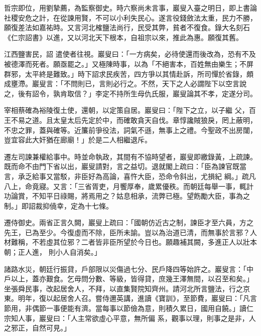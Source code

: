 \begin{pinyinscope}
 哲宗即位，用劉摯薦，為監察御史。時六察尚未言事，巖叟入臺之明日，即上書論社稷安危之計，在從諫用賢，不可以小利失民心。遂言役錢斂法太重，民力不勝，願復差法如嘉祐時。又言河北榷鹽法尚行，民受其弊，貧者不復食。錄大名刻石《仁宗詔書》以進，又以河北天下根本，自祖宗以來，推此為惠。願復其舊。



 江西鹽害民，詔
 遣使者往視。巖叟曰：「一方病矣，必待使還而後改為，恐有不及被德澤而死者。願亟罷之。」又極陳時事，以為「不絕害本，百姓無由樂生；不屏群邪，太平終是難致。」時下詔求民疾苦，四方爭以其情赴訴，所司憚於省錄，頗成壅滯。巖叟言：「不問則已，言則必行之。不然，天下之人必謂陛下以空言說之，後有詔令，孰肯取信？」李定不持所生母仇氏服，巖叟論其不孝，定遂分司。



 宰相蔡確為裕陵復土使，還朝，以定策自居。巖叟曰：「陛下之立，以子繼
 父，百王不易之道。且太皇太后先定於中，而確敢貪天自伐。章惇讒賊狼戾，罔上蔽明，不忠之罪，蓋與確等。近簾前爭役法，詞氣不遜，無事上之禮。今聖政不出房闥，豈宜容此大奸猶在廊廟！」於是二人相繼退斥。



 遷左司諫兼權給事中。時並命執政，其間有不協時望者，巖叟即繳錄黃，上疏諫。既而命不由門下省以出，巖叟請對，言之益切。退就閣上疏曰：「臣為諫官既當言，承乏給事又當駁，非臣好為高論，喜忤大臣，恐命令斜出，尤損紀
 綱。」疏凡八上，命竟寢。又言：「三省胥吏，月饗厚奉，歲累優秩。而朝廷每舉一事，輒計功論賞，不知平日祿賜，將焉用之？姑息相承，流弊已極。望飭勵大臣，事為之制。」即詔裁抑僥幸，定為十七條。



 遷侍御史。兩省正言久闕，巖叟上疏曰：「國朝仿近古之制，諫臣才至六員，方之先王，已為至少。今復虛而不除，臣所未諭。豈以為治道已清，而無事於言邪？人材難稱，不若虛其位邪？二者皆非臣所望於今日也。願趣補其闕，多進正人以壯本朝；正人進，
 則小人自消矣。」



 諸路水災，朝廷行振貸，戶部限以災傷過七分、民戶降四等始許之。巖叟言：「中戶以上，蓋亦艱食。乞毋問分數、等級，皆得貸，庶幾王澤無間，以召至和矣。」坐張舜民事，改起居舍人，不拜，以直集賢院知齊州。請河北所言鹽法，行之京東。明年，復以起居舍人召。嘗侍邇英講，進讀《寶訓》，至節費，巖叟曰：「凡言節用，非偶節一事便能有濟。當每事以節儉為意，則積久累日，國用自饒。」讀仁宗知人事，巖叟曰：「人主常欲虛心平意，無所偏
 系，觀事以理，則事之是非，人之邪正，自然可見。」




\end{pinyinscope}
